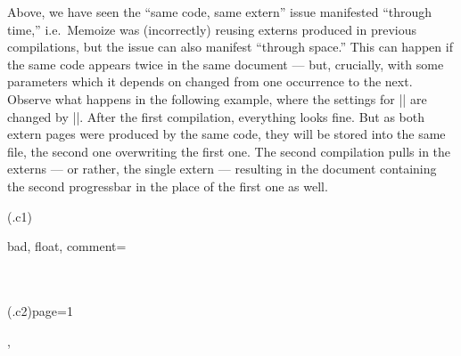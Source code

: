 \documentclass[a4paper,11pt]{article}
\begin{document}
Above, we have seen the ``same code, same extern'' issue manifested ``through
time,'' i.e.\ Memoize was (incorrectly) reusing externs produced in previous
compilations, but the issue can also manifest ``through space.''  This can
happen if the same code appears twice in the same document --- but, crucially,
with some parameters which it depends on changed from one occurrence to the
next.  Observe what happens in the following example, where the settings for
|\progressbar| are changed by |\progressbarchange|.  After the first
compilation, everything looks fine.  But as both extern pages were produced by
the same code, they will be stored into the same file, the second one
overwriting the first one.  The second compilation pulls in the externs --- or
rather, the single extern --- resulting in the document containing the second
progressbar in the place of the first one as well.

(.c1){
  bad, float,
  comment={
    \begin{tcbitemize}[raster columns=3,raster equal height,halign=center,valign=center]
      \tcbitem[title=After 1\textsuperscript{st} compilation]
      \\
      \\
      \tcbitem[title=After extern extraction\vphantom{p\textsuperscript{nd}}]
      \tcbitem[title=After 2\textsuperscript{nd} compilation]
      (.c2){page=1}
    \end{tcbitemize}
  },
}
\end{document}
